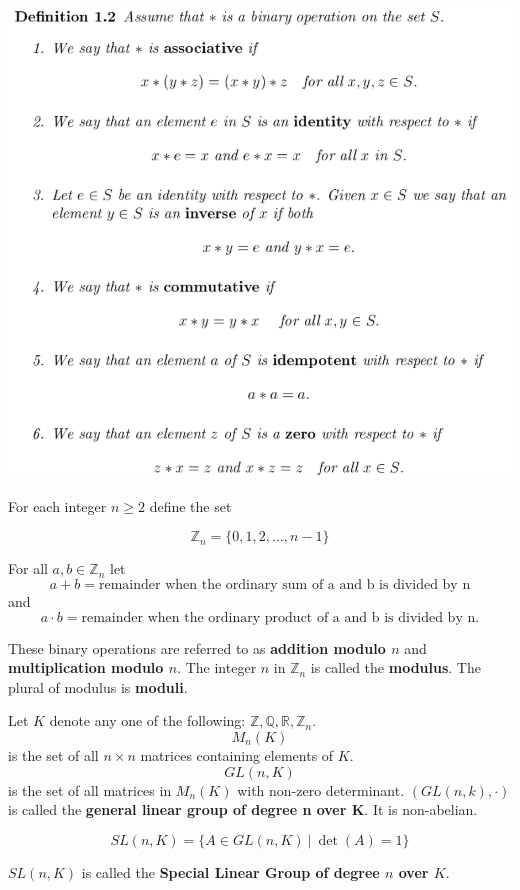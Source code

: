 \documentclass{article}
\begin{document}
\includegraphics[scale=0.45]{binary_operation2}

\pagebreak

For each integer \(n \geq 2\) define the set

\[
\mathbb{Z}_n = \{0, 1, 2, \ldots, n-1\}
\]

For all \(a, b \in \mathbb{Z}_n\) let \[a + b = \text{remainder when the ordinary sum of a and b is divided by n}\] and \[a \cdot b = \text{remainder when the ordinary product of a and b is divided by n.}\]

These binary operations are referred to as \textbf{addition modulo \(n\)} and \textbf{multiplication modulo \(n\)}. The integer \(n\) in \(\mathbb{Z}_n\) is called the \textbf{modulus}. The plural of modulus is \textbf{moduli}.

Let \(K\) denote any one of the following: \(\mathbb{Z}, \mathbb{Q}, \mathbb{R}, \mathbb{Z}_n\). \[M_n(K)\] is the set of all \(n \times n\) matrices containing elements of \(K\). \[GL(n, K)\] is the set of all matrices in \(M_{n}(K)\) with non-zero determinant. \((GL(n, k), \cdot)\) is called the \textbf{general linear group of degree n over K}. It is non-abelian.

\[
SL(n, K) = \{A \in GL(n, K) \ | \ \det(A) = 1\}
\]

\(SL(n, K)\) is called the \textbf{Special Linear Group of degree \(n\) over \(K\)}.
\end{document}
